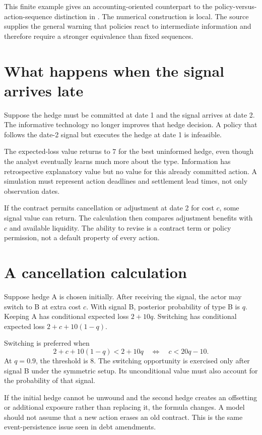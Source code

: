 This finite example gives an accounting-oriented counterpart to the policy-versus-action-sequence distinction in \citet[Section 3.1]{givan2003}. The numerical construction is local. The source supplies the general warning that policies react to intermediate information and therefore require a stronger equivalence than fixed sequences.

\section{What happens when the signal arrives late}
Suppose the hedge must be committed at date 1 and the signal arrives at date 2. The informative technology no longer improves that hedge decision. A policy that follows the date-2 signal but executes the hedge at date 1 is infeasible.

The expected-loss value returns to 7 for the best uninformed hedge, even though the analyst eventually learns much more about the type. Information has retrospective explanatory value but no value for this already committed action. A simulation must represent action deadlines and settlement lead times, not only observation dates.

If the contract permits cancellation or adjustment at date 2 for cost $c$, some signal value can return. The calculation then compares adjustment benefits with $c$ and available liquidity. The ability to revise is a contract term or policy permission, not a default property of every action.

\section{A cancellation calculation}
Suppose hedge A is chosen initially. After receiving the signal, the actor may switch to B at extra cost $c$. With signal B, posterior probability of type B is $q$. Keeping A has conditional expected loss $2+10q$. Switching has conditional expected loss $2+c+10(1-q)$.

Switching is preferred when
\begin{equation}
 2+c+10(1-q)<2+10q\quad\Longleftrightarrow\quad c<20q-10.
\end{equation}
At $q=0.9$, the threshold is 8. The switching opportunity is exercised only after signal B under the symmetric setup. Its unconditional value must also account for the probability of that signal.

If the initial hedge cannot be unwound and the second hedge creates an offsetting or additional exposure rather than replacing it, the formula changes. A model should not assume that a new action erases an old contract. This is the same event-persistence issue seen in debt amendments.

